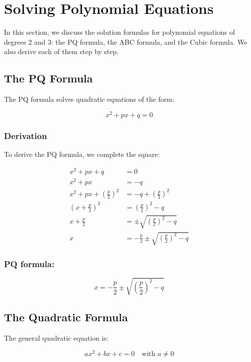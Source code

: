 \newpage
\section{Solving Polynomial Equations}

In this section, we discuss the solution formulas for polynomial equations of degrees 2 and 3: the PQ 
formula, the ABC formula, and the Cubic formula. We also derive each of them step by step.

\subsection{The PQ Formula}

The PQ formula solves quadratic equations of the form:

\[
    x^2 + px + q = 0
\]

\subsubsection{Derivation}

To derive the PQ formula, we complete the square:

\begin{align*}
    x^2 + px + q &= 0 \\
    x^2 + px &= -q \\
    x^2 + px + {\left(\frac{p}{2}\right)}^2 &= -q + {\left(\frac{p}{2}\right)}^2 \\
    {\left(x + \frac{p}{2}\right)}^2 &= {\left(\frac{p}{2}\right)}^2 - q \\
    x + \frac{p}{2} &= \pm \sqrt{{\left(\frac{p}{2}\right)}^2 - q} \\
    x &= -\frac{p}{2} \pm \sqrt{{\left(\frac{p}{2}\right)}^2 - q}
\end{align*}

\subsubsection{PQ formula:}

\[
    x = -\frac{p}{2} \pm \sqrt{{\left(\frac{p}{2}\right)}^2 - q}
\]

\subsection{The Quadratic Formula}

The general quadratic equation is:

\[
    ax^2 + bx + c = 0 \quad\text{with } a \ne 0
\]

